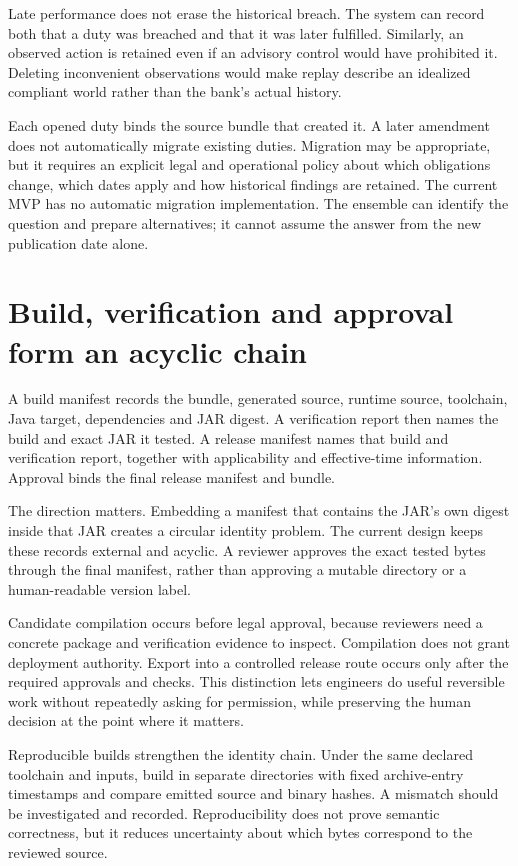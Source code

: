 \documentclass[12pt,a4paper,oneside,openany]{book}
\begin{document}
Late performance does not erase the historical breach. The system can record both
that a duty was breached and that it was later fulfilled. Similarly, an observed
action is retained even if an advisory control would have prohibited it. Deleting
inconvenient observations would make replay describe an idealized compliant world
rather than the bank's actual history.

Each opened duty binds the source bundle that created it. A later amendment does
not automatically migrate existing duties. Migration may be appropriate, but it
requires an explicit legal and operational policy about which obligations change,
which dates apply and how historical findings are retained. The current MVP has
no automatic migration implementation. The ensemble can identify the question
and prepare alternatives; it cannot assume the answer from the new publication
date alone.

\section{Build, verification and approval form an acyclic chain}

A build manifest records the bundle, generated source, runtime source, toolchain,
Java target, dependencies and JAR digest. A verification report then names the
build and exact JAR it tested. A release manifest names that build and verification
report, together with applicability and effective-time information. Approval
binds the final release manifest and bundle.

The direction matters. Embedding a manifest that contains the JAR's own digest
inside that JAR creates a circular identity problem. The current design keeps
these records external and acyclic. A reviewer approves the exact tested bytes
through the final manifest, rather than approving a mutable directory or a
human-readable version label.

Candidate compilation occurs before legal approval, because reviewers need a
concrete package and verification evidence to inspect. Compilation does not grant
deployment authority. Export into a controlled release route occurs only after
the required approvals and checks. This distinction lets engineers do useful
reversible work without repeatedly asking for permission, while preserving the
human decision at the point where it matters.

Reproducible builds strengthen the identity chain. Under the same declared
toolchain and inputs, build in separate directories with fixed archive-entry
timestamps and compare emitted source and binary hashes. A mismatch should be
investigated and recorded. Reproducibility does not prove semantic correctness,
but it reduces uncertainty about which bytes correspond to the reviewed source.
\end{document}
